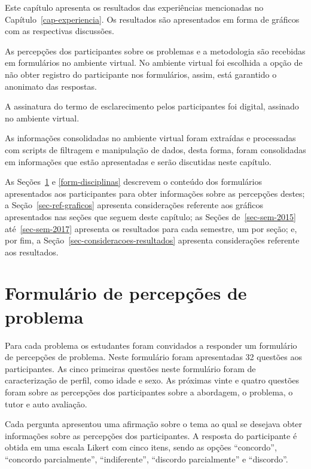 \acresetall

Este capítulo apresenta os resultados das experiências
mencionadas no Capítulo~\ref{cap-experiencia}.
Os resultados são apresentados em forma de gráficos com
as respectivas discussões.

As percepções dos participantes sobre os problemas e a metodologia
são recebidas em formulários no ambiente virtual.
No ambiente virtual foi escolhida a opção de não
obter registro do participante nos formulários, assim,
está garantido o anonimato das respostas.

A assinatura do termo de esclarecimento pelos participantes foi
digital, assinado no ambiente virtual.

As informações consolidadas no ambiente virtual foram
extraídas e processadas com scripts de filtragem e manipulação de dados,
desta forma, foram consolidadas em informações que estão apresentadas
e serão discutidas neste capítulo.

As Seções~\ref{form-percepcoes} e \ref{form-disciplinas} descrevem
o conteúdo dos formulários apresentados aos participantes para obter
informações sobre as percepções destes;
a Seção~\ref{sec-ref-graficos} apresenta considerações referente aos
gráficos apresentados nas seções que seguem deste capítulo;
as Seções de~\ref{sec-sem-2015} até~\ref{sec-sem-2017}
apresenta os resultados para cada semestre, um por seção;
e, por fim, a Seção~\ref{sec-consideracoes-resultados} apresenta
considerações referente aos resultados.

\section{Formulário de percepções de problema}
\label{form-percepcoes}
Para cada problema os estudantes foram convidados a responder um formulário de percepções de problema.
Neste formulário foram apresentadas 32 questões aos participantes.
As cinco primeiras questões neste formulário foram de caracterização de perfil, como
idade e sexo.
As próximas vinte e quatro questões foram sobre as percepções dos participantes sobre a abordagem, o
problema, o tutor e auto avaliação.

Cada pergunta apresentou uma afirmação sobre o tema ao qual se desejava obter informações sobre as
percepções dos participantes.
A resposta do participante é obtida em uma escala Likert com cinco itens, sendo as opções
``concordo'', ``concordo parcialmente'', ``indiferente'', ``discordo parcialmente'' e ``discordo''.

